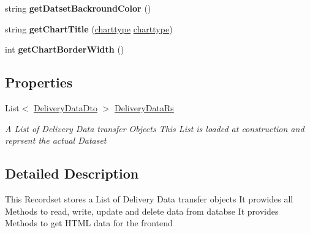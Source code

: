 \begin{DoxyCompactItemize}
\item 
\mbox{\label{classkpi_mvc_api_1_1_data_transfer_objects_1_1_delivery_data_dto_rs_a963e855134d343e9686771929910db26}} 
string {\bfseries get\+Datset\+Backround\+Color} ()
\item 
\mbox{\label{classkpi_mvc_api_1_1_data_transfer_objects_1_1_delivery_data_dto_rs_ac70ae0c1b987978a5c090a4d3e4707c7}} 
string {\bfseries get\+Chart\+Title} (\hyperlink{classkpi_mvc_api_1_1_data_transfer_objects_1_1_delivery_data_dto_rs_a09a01f7e378bb8d705847ee3b4fd06f0}{charttype} \hyperlink{classkpi_mvc_api_1_1_data_transfer_objects_1_1_delivery_data_dto_rs_a09a01f7e378bb8d705847ee3b4fd06f0}{charttype})
\item 
\mbox{\label{classkpi_mvc_api_1_1_data_transfer_objects_1_1_delivery_data_dto_rs_a91f1349a7d1f86bbb2a75faa9c99595f}} 
int {\bfseries get\+Chart\+Border\+Width} ()
\end{DoxyCompactItemize}
\subsection*{Properties}
\begin{DoxyCompactItemize}
\item 
List$<$ \hyperlink{classkpi_mvc_api_1_1_data_transfer_objects_1_1_delivery_data_dto}{Delivery\+Data\+Dto} $>$ \hyperlink{classkpi_mvc_api_1_1_data_transfer_objects_1_1_delivery_data_dto_rs_ae096dfea7797a7e0614150291a66c7bf}{Delivery\+Data\+Rs}
\begin{DoxyCompactList}\small\item\em A List of Delivery Data transfer Objects This List is loaded at construction and reprsent the actual Dataset \end{DoxyCompactList}\end{DoxyCompactItemize}


\subsection{Detailed Description}
This Recordset stores a List of Delivery Data transfer objects It prowides all Methods to read, write, update and delete data from databse It provides Methods to get H\+T\+ML data for the frontend 



